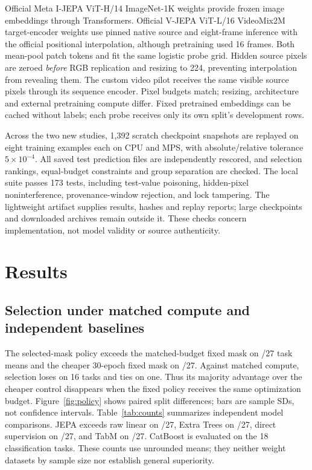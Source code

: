 \documentclass{article}
\begin{document}
Official Meta I-JEPA ViT-H/14 ImageNet-1K weights provide frozen image embeddings through Transformers. Official V-JEPA ViT-L/16 VideoMix2M target-encoder weights use pinned native source and eight-frame inference with the official positional interpolation, although pretraining used 16 frames. Both mean-pool patch tokens and fit the same logistic probe grid. Hidden source pixels are zeroed \emph{before} RGB replication and resizing to 224, preventing interpolation from revealing them. The custom video pilot receives the same visible source pixels through its sequence encoder. Pixel budgets match; resizing, architecture and external pretraining compute differ. Fixed pretrained embeddings can be cached without labels; each probe receives only its own split's development rows.

Across the two new studies, 1,392 scratch checkpoint snapshots are replayed on eight training examples each on CPU and MPS, with absolute/relative tolerance $5\times10^{-4}$. All saved test prediction files are independently rescored, and selection rankings, equal-budget constraints and group separation are checked. The local suite passes 173 tests, including test-value poisoning, hidden-pixel noninterference, provenance-window rejection, and lock tampering. The lightweight artifact supplies results, hashes and replay reports; large checkpoints and downloaded archives remain outside it. These checks concern implementation, not model validity or source authenticity.

\section{Results}
\subsection{Selection under matched compute and independent baselines}
The selected-mask policy exceeds the matched-budget fixed mask on \ExtPolicyWins/27 task means and the cheaper 30-epoch fixed mask on \ExtShortWins/27. Against matched compute, selection loses on 16 tasks and ties on one. Thus its majority advantage over the cheaper control disappears when the fixed policy receives the same optimization budget. Figure~\ref{fig:policy} shows paired split differences; bars are sample SDs, not confidence intervals. Table~\ref{tab:counts} summarizes independent model comparisons. JEPA exceeds raw linear on \ExtLinearWins/27, Extra Trees on \ExtTreesWins/27, direct supervision on \ExtSupervisedWins/27, and TabM on \ExtTabMWins/27. CatBoost is evaluated on the 18 classification tasks. These counts use unrounded means; they neither weight datasets by sample size nor establish general superiority.
\end{document}
